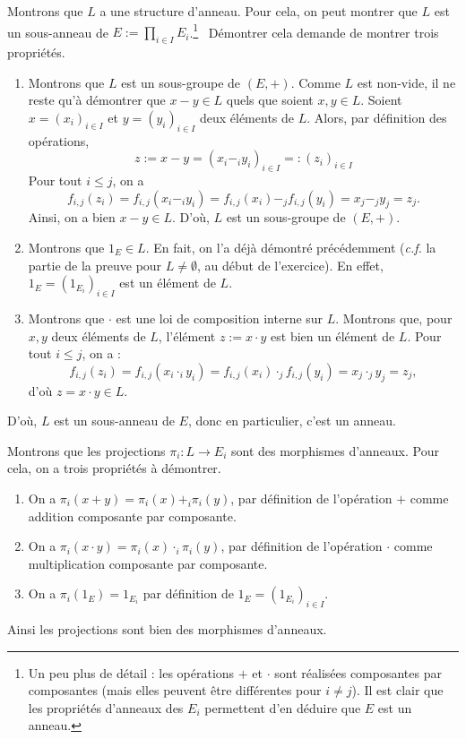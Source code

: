 \documentclass{../../td}
\makeatletter
\newcommand\showfootnote{%
  \tfn@tablefootnoteprintout%
  \gdef\tfn@fnt{0}%
}
\makeatother
\begin{document}
  Montrons que $L$ a une structure d'anneau.
  Pour cela, on peut montrer que $L$ est un sous-anneau de $E := \prod_{i \in I} E_i$.\footnote{Un peu plus de détail : les opérations $+$ et $\cdot$ sont réalisées composantes par composantes (mais elles peuvent être différentes pour $i \neq j$). Il est clair que les propriétés d'anneaux des $E_i$ permettent d'en déduire que $E$ est un anneau.}\showfootnote\ 
  Démontrer cela demande de montrer trois propriétés.
  \begin{enumerate}
    \item Montrons que $L$ est un sous-groupe de $(E, +)$.
      Comme $L$ est non-vide, il ne reste qu'à démontrer que $x - y \in L$ quels que soient $x, y \in L$.
      Soient $x = (x_i)_{i \in I}$ et $y = (y_i)_{i \in I}$ deux éléments de $L$.
      Alors, par définition des opérations, \[
        z := x - y = (x_i -_i y_i) _{i \in I} =: (z_i)_{i \in I}
      \]
      Pour tout $i \le j$, on a \[
        f_{i,j}(z_i) = f_{i,j}(x_i -_i y_i) = f_{i,j}(x_i) -_j f_{i,j}(y_i) = x_j -_j y_j = z_j
      .\]
      Ainsi, on a bien $x - y \in L$.
      D'où, $L$ est un sous-groupe de $(E, +)$.

    \item Montrons que $1_E \in L$.
      En fait, on l'a déjà démontré précédemment (\textit{c.f.} la partie de la preuve pour $L \neq \emptyset$, au début de l'exercice).
      En effet, $1_E = (1_{E_i})_{i \in I}$ est un élément de $L$.


    \item Montrons que $\cdot$ est une loi de composition interne sur $L$.
      Montrons que, pour $x,y$ deux éléments de $L$, l'élément $z := x \cdot y$ est bien un élément de $L$.
      Pour tout $i \le j$, on a :
      \[
      f_{i,j}(z_i) = f_{i,j}(x_i \cdot_i y_i) = f_{i,j}(x_i) \cdot_j f_{i,j}(y_i) = x_j \cdot_j y_j = z_j
      ,\] d'où $z = x\cdot y \in L$.
  \end{enumerate}

  D'où, $L$ est un sous-anneau de $E$, donc en particulier, c'est un anneau.

  Montrons que les projections $\pi_i : L \to E_i$ sont des morphismes d'anneaux.
  Pour cela, on a trois propriétés à démontrer.
  \begin{enumerate}
    \item On a $\pi_i(x + y) = \pi_i(x) +_i \pi_i(y)$, par définition de l'opération $+$ comme addition composante par composante.
    \item On a $\pi_i(x \cdot  y) = \pi_i(x) \cdot_i \pi_i(y)$, par définition de l'opération $\cdot$ comme multiplication composante par composante.
    \item On a $\pi_i(1_E) = 1_{E_i}$ par définition de $1_E = (1_{E_i})_{i \in I}$.
  \end{enumerate}
  Ainsi les projections sont bien des morphismes d'anneaux.
\end{document}
